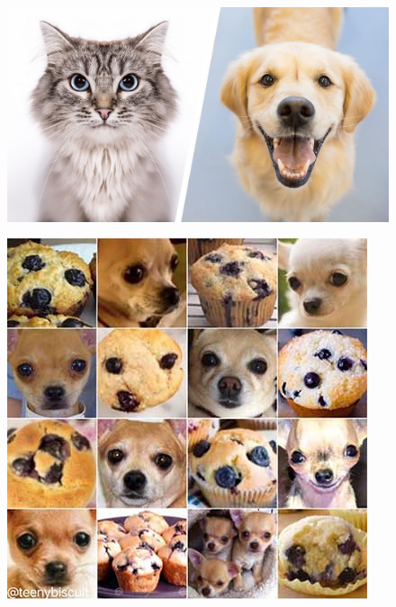 \begin{frame}
   \vspace{.3cm}
   \begin{minipage}{0.38\linewidth}
      \begin{figure}[H]
         \includegraphics[scale=.09]{../images/illustrations/model_cat_dog.jpeg}
      \end{figure}
   \end{minipage}
   \begin{minipage}{0.38\linewidth}
      \begin{figure}[H]
         \includegraphics[scale=.2]{../images/illustrations/model_puppy_or_cookie.jpeg}
      \end{figure}
   \end{minipage}
\end{frame}


